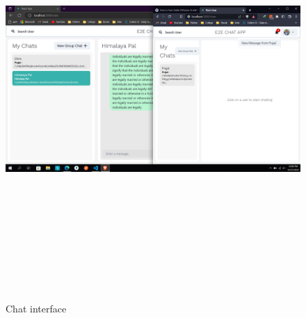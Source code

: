 \begin{figure}[H]
	\centering
	\includegraphics[width=160mm, height=160mm]{images/chat1.png}
	\caption{Chat interface} %
	\label{figusecase} %
\end{figure}




